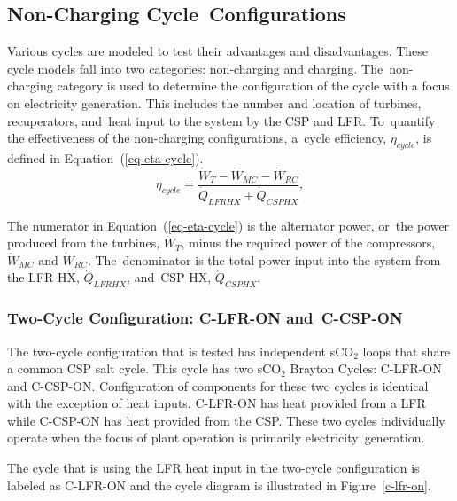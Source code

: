 \documentclass[sustainability,article,accept,moreauthors,pdftex]{Definitions/mdpi}
\begin{document}
\begin{paracol}{2}
\subsection{Non-Charging Cycle~Configurations} 

Various cycles are modeled to test their advantages and disadvantages. These cycle models fall into two categories: non-charging and charging. The~non-charging category is used to determine the configuration of the cycle with a focus on electricity generation. This includes the number and location of turbines, recuperators, and~heat input to the system by the CSP and LFR. To~quantify the effectiveness of the non-charging configurations, a~cycle efficiency, $\eta_{cycle}$, is defined in Equation~(\ref{eq-eta-cycle}).
\begin{equation}
    \label{eq-eta-cycle}
    \eta_{cycle} = \frac{\dot{W}_{T}-\dot{W}_{MC}-\dot{W}_{RC}}{\dot{Q}_{LFRHX}+\dot{Q}_{CSPHX}},
\end{equation}

The numerator in Equation~(\ref{eq-eta-cycle}) is the alternator power, or~the power produced from the turbines, $\dot{W}_{T}$, minus the required power of the compressors, $\dot{W}_{MC}$ and $\dot{W}_{RC}$. The~denominator is the total power input into the system from the LFR HX, $\dot{Q}_{LFRHX}$, and~CSP HX, $\dot{Q}_{CSPHX}$.


\subsubsection{Two-Cycle Configuration: C-LFR-ON and~C-CSP-ON} %

The two-cycle configuration that is tested has independent sCO$_{2}$ loops that share a common CSP salt cycle. This cycle has two sCO$_{2}$ Brayton Cycles: C-LFR-ON and C-CSP-ON. Configuration of components for these two cycles is identical with the exception of heat inputs. C-LFR-ON has heat provided from a LFR while C-CSP-ON has heat provided from the CSP. These two cycles individually operate when the focus of plant operation is primarily electricity~generation. 
    
The cycle that is using the LFR heat input in the two-cycle configuration is labeled as C-LFR-ON and the cycle diagram is illustrated in Figure~\ref{c-lfr-on}. 


\end{paracol}
\end{document}
